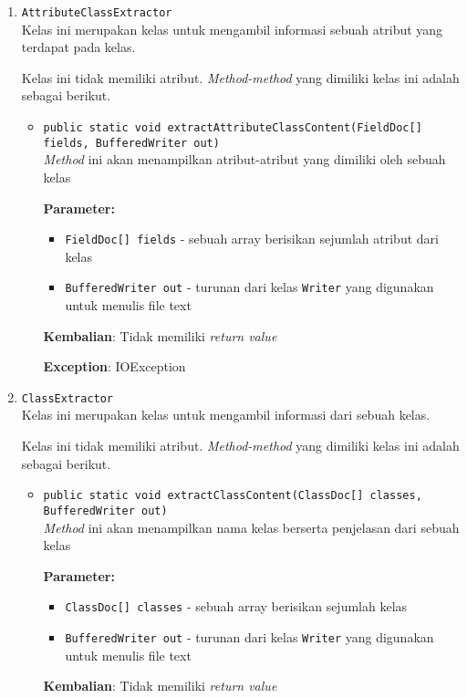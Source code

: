 \documentclass{article}
\begin{document}
\begin{enumerate}
\item \texttt{AttributeClassExtractor}\\ 
Kelas ini merupakan kelas untuk mengambil informasi sebuah atribut yang terdapat pada kelas.

Kelas ini tidak memiliki atribut. \textit{Method-method} yang dimiliki kelas ini adalah sebagai berikut.
\begin{itemize}
\item \texttt{public static void extractAttributeClassContent(FieldDoc[] fields, BufferedWriter out)}\\ 
\textit{Method} ini akan menampilkan atribut-atribut yang dimiliki oleh sebuah kelas

\textbf{Parameter:}
\begin{itemize}
\item \texttt{FieldDoc[] fields} - 
sebuah array berisikan sejumlah atribut dari kelas
\item \texttt{BufferedWriter out} - 
turunan dari kelas \texttt{Writer} yang digunakan untuk menulis file text
\end{itemize}
\textbf{Kembalian}: Tidak memiliki \textit{return value}

\textbf{Exception}: IOException

\end{itemize}
\item \texttt{ClassExtractor}\\ 
Kelas ini merupakan kelas untuk mengambil informasi dari sebuah kelas.

Kelas ini tidak memiliki atribut. \textit{Method-method} yang dimiliki kelas ini adalah sebagai berikut.
\begin{itemize}
\item \texttt{public static void extractClassContent(ClassDoc[] classes, BufferedWriter out)}\\ 
\textit{Method} ini akan menampilkan nama kelas berserta penjelasan dari sebuah kelas

\textbf{Parameter:}
\begin{itemize}
\item \texttt{ClassDoc[] classes} - 
sebuah array berisikan sejumlah kelas
\item \texttt{BufferedWriter out} - 
turunan dari kelas \texttt{Writer} yang digunakan untuk menulis file text
\end{itemize}
\textbf{Kembalian}: Tidak memiliki \textit{return value}


\end{itemize}
\end{enumerate}
\end{document}

